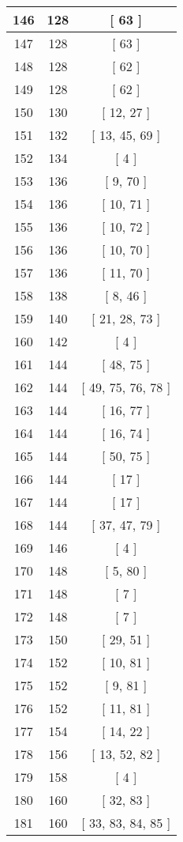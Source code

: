 \begin{center}
\begin{longtable}[H]{|| c c c ||}
\hline
146 & 128 & [ 63 ] \\ 
\hline
147 & 128 & [ 63 ] \\ 
\hline
148 & 128 & [ 62 ] \\ 
\hline
149 & 128 & [ 62 ] \\ 
\hline
150 & 130 & [ 12, 27 ] \\ 
\hline
151 & 132 & [ 13, 45, 69 ] \\ 
\hline
152 & 134 & [ 4 ] \\ 
\hline
153 & 136 & [ 9, 70 ] \\ 
\hline
154 & 136 & [ 10, 71 ] \\ 
\hline
155 & 136 & [ 10, 72 ] \\ 
\hline
156 & 136 & [ 10, 70 ] \\ 
\hline
157 & 136 & [ 11, 70 ] \\ 
\hline
158 & 138 & [ 8, 46 ] \\ 
\hline
159 & 140 & [ 21, 28, 73 ] \\ 
\hline
160 & 142 & [ 4 ] \\ 
\hline
161 & 144 & [ 48, 75 ] \\ 
\hline
162 & 144 & [ 49, 75, 76, 78 ] \\ 
\hline
163 & 144 & [ 16, 77 ] \\ 
\hline
164 & 144 & [ 16, 74 ] \\ 
\hline
165 & 144 & [ 50, 75 ] \\ 
\hline
166 & 144 & [ 17 ] \\ 
\hline
167 & 144 & [ 17 ] \\ 
\hline
168 & 144 & [ 37, 47, 79 ] \\ 
\hline
169 & 146 & [ 4 ] \\ 
\hline
170 & 148 & [ 5, 80 ] \\ 
\hline
171 & 148 & [ 7 ] \\ 
\hline
172 & 148 & [ 7 ] \\ 
\hline
173 & 150 & [ 29, 51 ] \\ 
\hline
174 & 152 & [ 10, 81 ] \\ 
\hline
175 & 152 & [ 9, 81 ] \\ 
\hline
176 & 152 & [ 11, 81 ] \\ 
\hline
177 & 154 & [ 14, 22 ] \\ 
\hline
178 & 156 & [ 13, 52, 82 ] \\ 
\hline
179 & 158 & [ 4 ] \\ 
\hline
180 & 160 & [ 32, 83 ] \\ 
\hline
181 & 160 & [ 33, 83, 84, 85 ] \\ 

\end{longtable}
\end{center}
